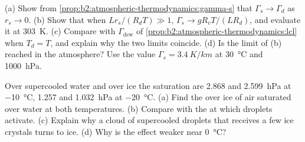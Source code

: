 \begin{exercise}[$\star\star\star$]\label{exo:b2:atmospheric-thermodynamics:11}
(a) Show from \cref{prop:b2:atmospheric-thermodynamics:gamma-s} that $\Gamma_s \to \Gamma_d$
as $r_s \to 0$. (b) Show that when $Lr_s/(R_dT) \gg 1$, $\Gamma_s \to gR_vT/(LR_d)$, and
evaluate it at \qty{303}{K}. (c) Compare with $\Gamma_{\text{dew}}$ of
\cref{prop:b2:atmospheric-thermodynamics:lcl} when $T_d = T$, and explain why the two limits
coincide. (d) Is the limit of (b) reached in the atmosphere? Use the value $\Gamma_s =
\qty{3.4}{K/km}$ at \qty{30}{\celsius} and \qty{1000}{hPa}.
\end{exercise}

\begin{exercise}[$\star\star\star$]\label{exo:b2:atmospheric-thermodynamics:12}
Over supercooled water and over ice the saturation  are 2.868 and
\qty{2.599}{hPa} at \qty{-10}{\celsius}, 1.257 and \qty{1.032}{hPa} at \qty{-20}{\celsius}.
(a) Find the  over ice of air saturated over water at both temperatures. (b)
Compare with the  at which droplets activate. (c) Explain why a cloud of
supercooled droplets that receives a few ice crystals turns to ice. (d) Why is the effect
weaker near \qty{0}{\celsius}?
\end{exercise}

